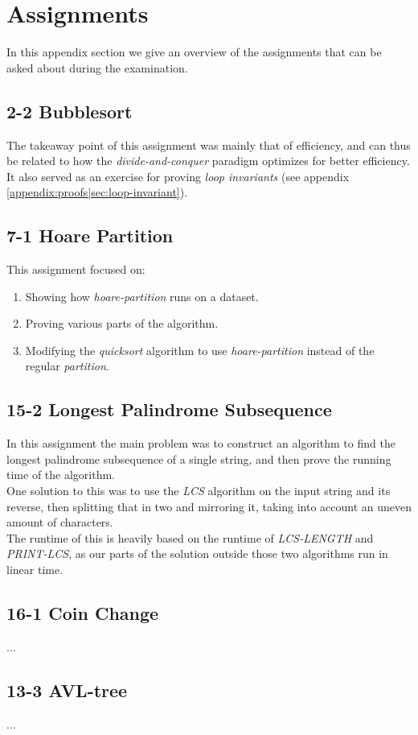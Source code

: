 
\thispagestyle{fancyplain}

\chapter{Assignments}
\label{appendix:assignments}
In this appendix section we give an overview of the assignments that can be
asked about during the examination.

\section{2-2 Bubblesort}
\label{appendix:assignments|ass:bubblesort}
The takeaway point of this assignment was mainly that of efficiency, and can
thus be related to how the \textit{divide-and-conquer} paradigm optimizes for
better efficiency. It also served as an exercise for proving \textit{loop
invariants} (see appendix \ref{appendix:proofs|sec:loop-invariant}).

\section{7-1 Hoare Partition}
\label{appendix:assignments|ass:hoare-partition}
This assignment focused on:
\begin{enumerate}
\item Showing how \textit{hoare-partition} runs on a dataset.
\item Proving various parts of the algorithm.
\item Modifying the \textit{quicksort} algorithm to use \textit{hoare-partition} 
instead of the regular \textit{partition}.
\end{enumerate}

\section{15-2 Longest Palindrome Subsequence}
\label{appendix:assignments|ass:longest-palindromic-subsequence}
In this assignment the main problem was to construct an algorithm to find the 
longest palindrome subsequence of a single string, and then prove the running 
time of the algorithm.\\
One solution to this was to use the \textit{LCS} algorithm on the input string 
and its reverse, then splitting that in two and mirroring it, taking into account 
an uneven amount of characters.\\
The runtime of this is heavily based on the runtime of \textit{LCS-LENGTH} and \textit{PRINT-LCS}, as our parts of the solution outside those two algorithms run in linear time.

\section{16-1 Coin Change}
\label{appendix:assignments|ass:coin-change}
...

\section{13-3 AVL-tree}
\label{appendix:assignments|ass:avl-tree}
...